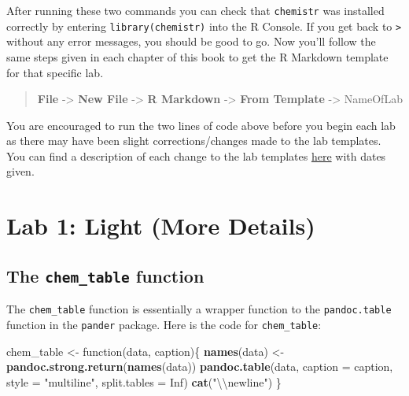 \documentclass[]{tufte-book}
\newenvironment{Shaded}{\begin{snugshade}}{\end{snugshade}}
\newcommand{\KeywordTok}[1]{\textcolor[rgb]{0.13,0.29,0.53}{\textbf{{#1}}}}
\newcommand{\DataTypeTok}[1]{\textcolor[rgb]{0.13,0.29,0.53}{{#1}}}
\newcommand{\CharTok}[1]{\textcolor[rgb]{0.31,0.60,0.02}{{#1}}}
\newcommand{\StringTok}[1]{\textcolor[rgb]{0.31,0.60,0.02}{{#1}}}
\newcommand{\OtherTok}[1]{\textcolor[rgb]{0.56,0.35,0.01}{{#1}}}
\newcommand{\NormalTok}[1]{{#1}}
\begin{document}
After running these two commands you can check that \texttt{chemistr}
was installed correctly by entering \texttt{library(chemistr)} into the
R Console. If you get back to \texttt{\textgreater{}} without any error
messages, you should be good to go. Now you'll follow the same steps
given in each chapter of this book to get the R Markdown template for
that specific lab.

\begin{quote}
\textbf{File} -\textgreater{} \textbf{New File} -\textgreater{}
\textbf{R Markdown} -\textgreater{} \textbf{From Template}
-\textgreater{} NameOfLab
\end{quote}

You are encouraged to run the two lines of code above before you begin
each lab as there may have been slight corrections/changes made to the
lab templates. You can find a description of each change to the lab
templates
\href{https://github.com/ismayc/chemistr/blob/master/NEWS.md}{here} with
dates given.

\chapter{Lab 1: Light (More Details)}\label{appendix-light}

\section{\texorpdfstring{The \texttt{chem\_table}
function}{The chem\_table function}}\label{the-chem_table-function}

The \texttt{chem\_table} function is essentially a wrapper function to
the \texttt{pandoc.table} function in the \texttt{pander} package. Here
is the code for \texttt{chem\_table}:

\begin{Shaded}
\begin{Highlighting}[]
\NormalTok{chem_table <-}\StringTok{ }\NormalTok{function(data, caption)\{}
  \KeywordTok{names}\NormalTok{(data) <-}\StringTok{ }\KeywordTok{pandoc.strong.return}\NormalTok{(}\KeywordTok{names}\NormalTok{(data))}
  \KeywordTok{pandoc.table}\NormalTok{(data, }\DataTypeTok{caption =} \NormalTok{caption, }\DataTypeTok{style =} \StringTok{"multiline"}\NormalTok{,}
               \DataTypeTok{split.tables =} \OtherTok{Inf}\NormalTok{)}
  \KeywordTok{cat}\NormalTok{(}\StringTok{"}\CharTok{\textbackslash{}\textbackslash{}}\StringTok{newline"}\NormalTok{)}
\NormalTok{\}}
\end{Highlighting}
\end{Shaded}
\end{document}
